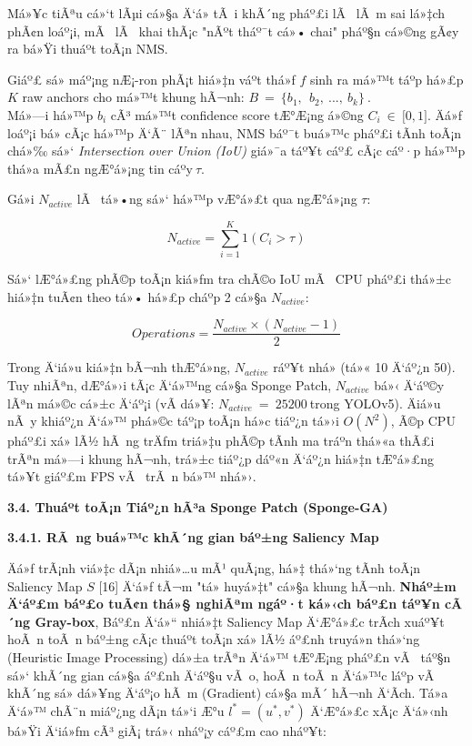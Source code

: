 \documentclass[]{article}
\begin{document}
Má»¥c tiÃªu cá»‘t lÃµi cá»§a Ä‘á» tÃ i khÃ´ng pháº£i lÃ  lÃ m sai lá»‡ch phÃ¢n loáº¡i, mÃ  lÃ 
khai thÃ¡c "nÃºt tháº¯t cá»• chai" pháº§n cá»©ng gÃ¢y ra bá»Ÿi thuáº­t toÃ¡n NMS.

Giáº£ sá»­ máº¡ng nÆ¡-ron phÃ¡t hiá»‡n váº­t thá»ƒ \(f\) sinh ra má»™t táº­p há»£p \(K\) raw 
anchors cho má»™t khung hÃ¬nh:
\(B\  = \ \{ b_{1},\ \ b_{2},\ ...,\ b_{k}\}\ .\)\\
Má»—i há»™p \(b_{i}\) cÃ³ má»™t confidence score tÆ°Æ¡ng á»©ng
\(C_{i}\  \in \ \lbrack 0,1\rbrack\). Äá»ƒ loáº¡i bá» cÃ¡c há»™p Ä‘Ã¨ lÃªn nhau,
NMS báº¯t buá»™c pháº£i tÃ­nh toÃ¡n chá»‰ sá»‘ \emph{Intersection over Union (IoU)}
giá»¯a táº¥t cáº£ cÃ¡c cáº·p há»™p thá»a mÃ£n ngÆ°á»¡ng tin cáº­y\(\ \tau\).

Gá»i \(N_{active}\) lÃ  tá»•ng sá»‘ há»™p vÆ°á»£t qua ngÆ°á»¡ng \(\tau\):

\[N_{active} = \sum_{i = 1}^{K}1\left( C_{i} > \tau \right)\]

Sá»‘ lÆ°á»£ng phÃ©p toÃ¡n kiá»ƒm tra chÃ©o IoU mÃ  CPU pháº£i thá»±c hiá»‡n tuÃ¢n theo tá»•
há»£p cháº­p 2 cá»§a \(N_{active}\):

\[Operations = \frac{N_{active} \times \left( N_{active} - 1 \right)}{2}\]

Trong Ä‘iá»u kiá»‡n bÃ¬nh thÆ°á»ng, \(N_{active}\) ráº¥t nhá» (tá»« 10 Ä‘áº¿n 50). Tuy
nhiÃªn, dÆ°á»›i tÃ¡c Ä‘á»™ng cá»§a Sponge Patch, \(N_{active}\) bá»‹ Ä‘áº©y
lÃªn má»©c cá»±c Ä‘áº¡i (vÃ­ dá»¥: \(N_{active}\  = \ 25200\ \)trong YOLOv5). Äiá»u
nÃ y khiáº¿n Ä‘á»™ phá»©c táº¡p toÃ¡n há»c tiáº¿n tá»›i \(O(N^{2})\), Ã©p CPU pháº£i xá»­ lÃ½
hÃ ng trÄƒm triá»‡u phÃ©p tÃ­nh ma tráº­n thá»«a thÃ£i trÃªn má»—i khung hÃ¬nh, trá»±c
tiáº¿p dáº«n Ä‘áº¿n hiá»‡n tÆ°á»£ng tá»¥t giáº£m FPS vÃ  trÃ n bá»™ nhá»›.

\textbf{3.4. Thuáº­t toÃ¡n Tiáº¿n hÃ³a Sponge Patch (Sponge-GA)}

\textbf{3.4.1. RÃ ng buá»™c khÃ´ng gian báº±ng Saliency Map}

Äá»ƒ trÃ¡nh viá»‡c dÃ¡n nhiá»…u mÃ¹ quÃ¡ng, há»‡ thá»‘ng tÃ­nh toÃ¡n Saliency Map \(S\)
{[}16{]} Ä‘á»ƒ tÃ¬m "tá»­ huyá»‡t" cá»§a khung hÃ¬nh. \textbf{Nháº±m Ä‘áº£m báº£o tuÃ¢n thá»§
nghiÃªm ngáº·t ká»‹ch báº£n táº¥n cÃ´ng Gray-box}, Báº£n Ä‘á»“ nhiá»‡t Saliency Map Ä‘Æ°á»£c
trÃ­ch xuáº¥t hoÃ n toÃ n báº±ng cÃ¡c thuáº­t toÃ¡n xá»­ lÃ½ áº£nh truyá»n thá»‘ng
(Heuristic Image Processing) dá»±a trÃªn Ä‘á»™ tÆ°Æ¡ng pháº£n vÃ  táº§n sá»‘ khÃ´ng gian
cá»§a áº£nh Ä‘áº§u vÃ o, hoÃ n toÃ n Ä‘á»™c láº­p vÃ  khÃ´ng sá»­ dá»¥ng Ä‘áº¡o hÃ m (Gradient)
cá»§a mÃ´ hÃ¬nh Ä‘Ã­ch. Tá»a Ä‘á»™ chÃ¨n miáº¿ng dÃ¡n tá»‘i Æ°u
\(l^{*} = \left( u^{*},v^{*} \right)\) Ä‘Æ°á»£c xÃ¡c Ä‘á»‹nh bá»Ÿi Ä‘iá»ƒm cÃ³ giÃ¡ trá»‹
nháº¡y cáº£m cao nháº¥t:
\end{document}
